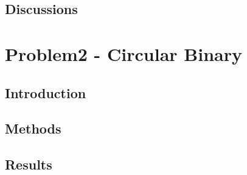 \documentclass[a4paper]{article}
\begin{document}
		\subsection{Discussions} \label{1:discussions}
	

	\section{Problem2 - Circular Binary} \label{Problem2}
	

		\subsection{Introduction} \label{2:introduction}


		\subsection{Methods} \label{2:methods}
		
		
		


		\subsection{Results} \label{2:results}
		
\end{document}
